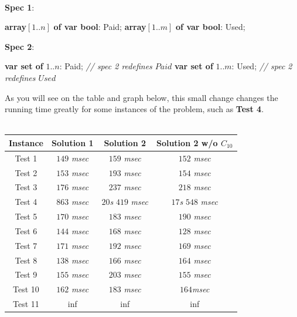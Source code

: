 \documentclass[conference]{IEEEtran}
\newcommand\tab[1][0.3cm]{\hspace*{#1}}
\begin{document}
\\
\textbf{Spec 1}:
\begin{algorithmic}
\State \textbf{array}$[1..n]$ \textbf{of var bool}: Paid;
\State \textbf{array}$[1..m]$ \textbf{of var bool}: Used;
\end{algorithmic}
\textbf{Spec 2}:
\begin{algorithmic}
\State \textbf{var set of} $1..n$: Paid; \textit{ // spec 2 redefines $Paid$}
\State \textbf{var set of }$1..m$: Used; \textit{ // spec 2 redefines $Used$}
\end{algorithmic}
\tab As you will see on the table and graph below, this small change changes the running time greatly for some instances of the problem, such as \textbf{Test 4}.
\\
\\
\begin{tabular}{ c | c | c | c}
 \hline
  Instance &Solution 1& Solution 2 & Solution 2 w/o $C_{10}$
  \\ \hline
      Test 1 & $149$ \textit{msec} & $159$ \textit{msec} & $152$ \textit{msec} \\ \hline 
      Test 2 & $153$ \textit{msec} & $193$ \textit{msec} & $154$ \textit{msec}  \\ \hline
      Test 3 & $176$ \textit{msec} & $237$ \textit{msec} & $218$ \textit{msec} \\ \hline
      Test 4 & $863$ \textit{msec} & $20$\textit{s} $419$ \textit{msec} & $17$\textit{s} $548$ \textit{msec} \\ \hline
      Test 5 & $170$ \textit{msec} & $183$ \textit{msec} & $190$ \textit{msec} \\ \hline
      Test 6 & $144$ \textit{msec} & $168$ \textit{msec} & $128$ \textit{msec} \\ \hline
      Test 7 & $171$ \textit{msec} & $192$ \textit{msec} & $169$ \textit{msec} \\ \hline
      Test 8 & $138$ \textit{msec} & $166$ \textit{msec} & $164$ \textit{msec} \\ \hline
      Test 9 & $155$ \textit{msec} & $203$ \textit{msec} & $155$ \textit{msec} \\ \hline
      Test 10 & $162$ \textit{msec} & $183$ \textit{msec} & $164$\textit{msec} \\ \hline
      Test 11 & inf & inf & inf\\ \hline
  \end{tabular}
\end{document}
